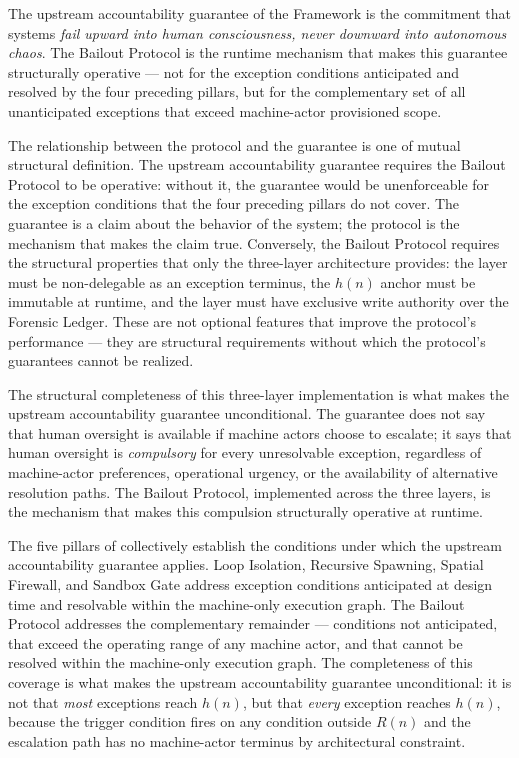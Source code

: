The upstream accountability guarantee of the \bxthree{} Framework is the commitment that \bxthree{} systems \emph{fail upward into human consciousness, never downward into autonomous chaos}. The Bailout Protocol is the runtime mechanism that makes this guarantee structurally operative --- not for the exception conditions anticipated and resolved by the four preceding pillars, but for the complementary set of all unanticipated exceptions that exceed machine-actor provisioned scope.

The relationship between the protocol and the guarantee is one of mutual structural definition. The upstream accountability guarantee requires the Bailout Protocol to be operative: without it, the guarantee would be unenforceable for the exception conditions that the four preceding pillars do not cover. The guarantee is a claim about the behavior of the system; the protocol is the mechanism that makes the claim true. Conversely, the Bailout Protocol requires the structural properties that only the \bxthree{} three-layer architecture provides: the \purpose{} layer must be non-delegable as an exception terminus, the $h(n)$ anchor must be immutable at runtime, and the \fact{} layer must have exclusive write authority over the Forensic Ledger. These are not optional features that improve the protocol's performance --- they are structural requirements without which the protocol's guarantees cannot be realized.

The structural completeness of this three-layer implementation is what makes the upstream accountability guarantee unconditional. The guarantee does not say that human oversight is available if machine actors choose to escalate; it says that human oversight is \emph{compulsory} for every unresolvable exception, regardless of machine-actor preferences, operational urgency, or the availability of alternative resolution paths. The Bailout Protocol, implemented across the three \bxthree{} layers, is the mechanism that makes this compulsion structurally operative at runtime.

The five pillars of \bxthree{} collectively establish the conditions under which the upstream accountability guarantee applies. Loop Isolation, Recursive Spawning, Spatial Firewall, and Sandbox Gate address exception conditions anticipated at design time and resolvable within the machine-only execution graph. The Bailout Protocol addresses the complementary remainder --- conditions not anticipated, that exceed the operating range of any machine actor, and that cannot be resolved within the machine-only execution graph. The completeness of this coverage is what makes the upstream accountability guarantee unconditional: it is not that \emph{most} exceptions reach $h(n)$, but that \emph{every} exception reaches $h(n)$, because the trigger condition fires on any condition outside $R(n)$ and the escalation path has no machine-actor terminus by architectural constraint.

